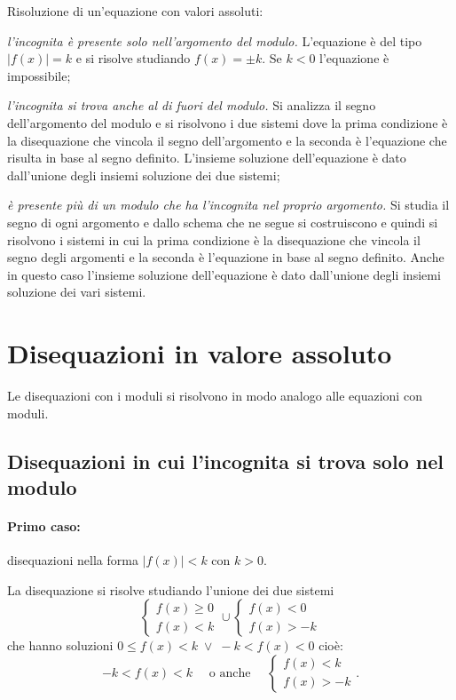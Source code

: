 \begin{procedura} {Risoluzione di un'equazione con valori assoluti:}
\begin{enumeratea}
\item \emph{l'incognita è presente solo nell'argomento del modulo.} L'equazione è del tipo $\left|f(x)\right|=k$ e si risolve studiando $f(x)=\pm k$. Se $k<0$ l'equazione è impossibile;
\item \emph{l'incognita si trova anche al di fuori del modulo.} Si analizza il segno dell'argomento del modulo e si risolvono i due sistemi dove la prima condizione è la disequazione che vincola il segno dell'argomento e la seconda è l'equazione che risulta in base al segno definito. L'insieme soluzione dell'equazione è dato dall'unione degli insiemi soluzione dei due sistemi;
\item \emph{è presente più di un modulo che ha l'incognita nel proprio argomento.} Si studia il segno di ogni argomento e dallo schema che ne segue si costruiscono e quindi si risolvono i sistemi in cui la prima condizione è la disequazione che vincola il segno degli argomenti e la seconda è l'equazione in base al segno definito. Anche in questo caso l'insieme soluzione dell'equazione è dato dall'unione degli insiemi soluzione dei vari sistemi.
\end{enumeratea}
\end{procedura}
\ovalbox{\risolvii \ref{ese:7.16}, \ref{ese:7.17}, \ref{ese:7.18}, \ref{ese:7.19}, \ref{ese:7.20}, \ref{ese:7.21}, \ref{ese:7.22}, \ref{ese:7.23}, \ref{ese:7.24}, \ref{ese:7.25}, \ref{ese:7.26}, \ref{ese:7.27}, \ref{ese:7.28}, \ref{ese:7.29}}

\section{Disequazioni in valore assoluto}
Le disequazioni con i moduli si risolvono in modo analogo alle equazioni con moduli.

\subsection{Disequazioni in cui l'incognita si trova solo nel modulo}
\paragraph{Primo caso:} disequazioni nella forma $\left|f(x)\right|<k$ con $ k>0 $.

La disequazione si risolve studiando l'unione dei due sistemi 
\[\left\{\begin{array}{l}{f(x)\ge 0}\\{f(x)<k}\end{array}\right.\cup\left\{\begin{array}{l}{f(x)< 0}\\{f(x)>-k}\end{array}\right.\]
che hanno soluzioni $ 0\le f(x)<k\;\vee\; -k<f(x)<0 $ cioè:
\[-k<f(x)<k\quad \text{ o anche }\quad\left\{\begin{array}{l}{f(x)< k}\\{f(x)>-k}\end{array}\right..\]


